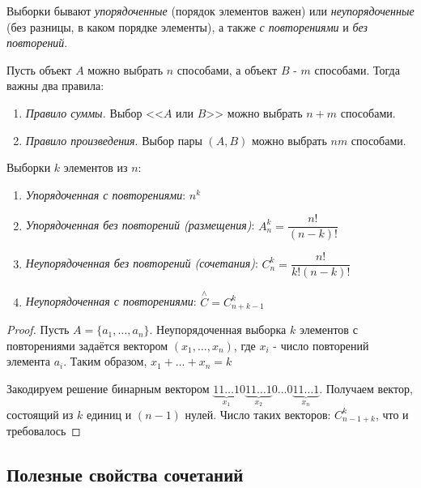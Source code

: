 \documentclass[a4paper, 14pt]{article}
\begin{document}
    Выборки бывают {\it упорядоченные} (порядок элементов важен) или {\it неупорядоченные} (без разницы, в каком порядке элементы),
    а также {\it с повторениями} и {\it без повторений}.

    Пусть объект $A$ можно выбрать $n$ способами, а объект
    $B$ - $m$ способами. Тогда важны два правила:
    \begin{enumerate}
        \item {\it Правило суммы.} Выбор <<$A$ или $B$>> можно выбрать $n+m$ способами.
        \item {\it Правило произведения}. Выбор пары $(A, B)$ можно выбрать $nm$ способами.
    \end{enumerate}

    \begin{definition}
        Выборки $k$ элементов из $n$:
        \begin{enumerate}
            \item {\it Упорядоченная с повторениями}: $n^k$
            \item {\it Упорядоченная без повторений (размещения)}: $A^k_n = \dfrac{n!}{(n-k)!}$
            \item {\it Неупорядоченная без повторений (сочетания)}: $C^k_n = \dfrac{n!}{k!(n-k)!}$
            \item {\it Неупорядоченная с повторениями}: $\stackrel{{\wedge}}{C} = C^k_{n+k-1}$
        \end{enumerate} 
        \begin{proof}
            Пусть $A = \{a_1, \dots, a_n\}$. Неупорядоченная выборка $k$ элементов
            с повторениями задаётся вектором $(x_1, \dots, x_n)$, где $x_i$ - число повторений
            элемента $a_i$. Таким образом, $x_1 + \dots + x_n = k$

            Закодируем решение бинарным вектором $\underbrace{11 \dots 1}_{x_1} 0 \underbrace{11 \dots 1}_{x_2} 0 \dots 0\underbrace{11 \dots 1}_{x_n}$.
            Получаем вектор, состоящий из $k$ единиц и $(n-1)$ нулей. Число таких векторов: $C^k_{n-1+k}$, что и требовалось
        \end{proof}
    \end{definition}

    \subsection*{Полезные свойства сочетаний}
\end{document}
